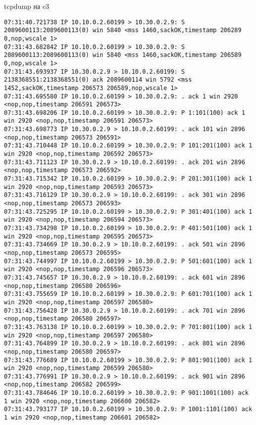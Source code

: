 \documentclass[a4paper,12pt]{article}
\begin{document}
tcpdump на c3
\begin{Verbatim}
07:31:40.721738 IP 10.10.0.2.60199 > 10.30.0.2.9: S 2089600113:2089600113(0) win 5840 <mss 1460,sackOK,timestamp 206289 0,nop,wscale 1>
07:31:43.682842 IP 10.10.0.2.60199 > 10.30.0.2.9: S 2089600113:2089600113(0) win 5840 <mss 1460,sackOK,timestamp 206589 0,nop,wscale 1>
07:31:43.693937 IP 10.30.0.2.9 > 10.10.0.2.60199: S 2138368551:2138368551(0) ack 2089600114 win 5792 <mss 1452,sackOK,timestamp 206573 206589,nop,wscale 1>
07:31:43.695580 IP 10.10.0.2.60199 > 10.30.0.2.9: . ack 1 win 2920 <nop,nop,timestamp 206591 206573>
07:31:43.698206 IP 10.10.0.2.60199 > 10.30.0.2.9: P 1:101(100) ack 1 win 2920 <nop,nop,timestamp 206591 206573>
07:31:43.698773 IP 10.30.0.2.9 > 10.10.0.2.60199: . ack 101 win 2896 <nop,nop,timestamp 206573 206591>
07:31:43.710448 IP 10.10.0.2.60199 > 10.30.0.2.9: P 101:201(100) ack 1 win 2920 <nop,nop,timestamp 206592 206573>
07:31:43.711123 IP 10.30.0.2.9 > 10.10.0.2.60199: . ack 201 win 2896 <nop,nop,timestamp 206573 206592>
07:31:43.715342 IP 10.10.0.2.60199 > 10.30.0.2.9: P 201:301(100) ack 1 win 2920 <nop,nop,timestamp 206593 206573>
07:31:43.716129 IP 10.30.0.2.9 > 10.10.0.2.60199: . ack 301 win 2896 <nop,nop,timestamp 206573 206593>
07:31:43.725295 IP 10.10.0.2.60199 > 10.30.0.2.9: P 301:401(100) ack 1 win 2920 <nop,nop,timestamp 206594 206573>
07:31:43.734298 IP 10.10.0.2.60199 > 10.30.0.2.9: P 401:501(100) ack 1 win 2920 <nop,nop,timestamp 206595 206573>
07:31:43.734669 IP 10.30.0.2.9 > 10.10.0.2.60199: . ack 501 win 2896 <nop,nop,timestamp 206573 206595>
07:31:43.744997 IP 10.10.0.2.60199 > 10.30.0.2.9: P 501:601(100) ack 1 win 2920 <nop,nop,timestamp 206596 206573>
07:31:43.745657 IP 10.30.0.2.9 > 10.10.0.2.60199: . ack 601 win 2896 <nop,nop,timestamp 206580 206596>
07:31:43.755659 IP 10.10.0.2.60199 > 10.30.0.2.9: P 601:701(100) ack 1 win 2920 <nop,nop,timestamp 206597 206580>
07:31:43.756428 IP 10.30.0.2.9 > 10.10.0.2.60199: . ack 701 win 2896 <nop,nop,timestamp 206580 206597>
07:31:43.763138 IP 10.10.0.2.60199 > 10.30.0.2.9: P 701:801(100) ack 1 win 2920 <nop,nop,timestamp 206597 206580>
07:31:43.764899 IP 10.30.0.2.9 > 10.10.0.2.60199: . ack 801 win 2896 <nop,nop,timestamp 206580 206597>
07:31:43.776689 IP 10.10.0.2.60199 > 10.30.0.2.9: P 801:901(100) ack 1 win 2920 <nop,nop,timestamp 206599 206580>
07:31:43.776991 IP 10.30.0.2.9 > 10.10.0.2.60199: . ack 901 win 2896 <nop,nop,timestamp 206582 206599>
07:31:43.784646 IP 10.10.0.2.60199 > 10.30.0.2.9: P 901:1001(100) ack 1 win 2920 <nop,nop,timestamp 206600 206582>
07:31:43.793177 IP 10.10.0.2.60199 > 10.30.0.2.9: P 1001:1101(100) ack 1 win 2920 <nop,nop,timestamp 206601 206582>

\end{Verbatim}
\end{document}
